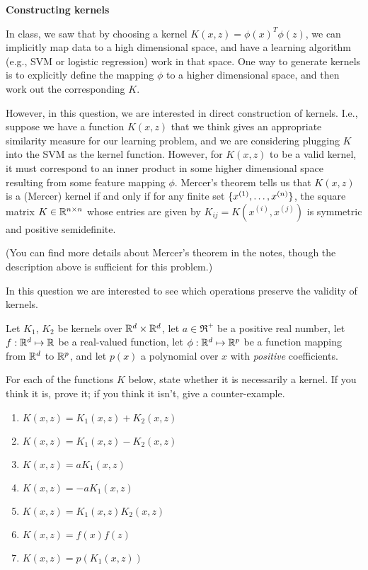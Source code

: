 \item {} {\bf Constructing kernels}

In class, we saw that by choosing a kernel $K(x,z) = \phi(x)^T\phi(z)$, we can
implicitly map data to a high dimensional space, and have a learning algorithm (e.g., SVM or logistic regression)
work in that space. One way to generate kernels is to explicitly define the
mapping $\phi$ to a higher dimensional space, and then work out the
corresponding $K$.

However, in this question, we are interested in direct construction of kernels.
I.e., suppose we have a function $K(x,z)$ that we think gives an appropriate
similarity measure for our learning problem, and we are considering plugging
$K$ into the SVM as the kernel function. However, for $K(x,z)$ to be a valid
kernel, it must correspond to an inner product in some higher dimensional space
resulting from some feature mapping $\phi$.  Mercer's theorem tells us that
$K(x,z)$ is a (Mercer) kernel if and only if for any finite set $\{x^{(1)},
\ldots, x^{({n})}\}$, the square matrix $K \in {\mathbb R}^{{n} \times {n}}$ whose entries
are given by $K_{ij} = K(x^{(i)},x^{(j)})$ is symmetric and positive
semidefinite.

(You can find more details about Mercer's theorem in the notes, though the description above is sufficient for this problem.)

%
In this question we are interested to see which operations preserve the validity of kernels. 
%

Let $K_1$, $K_2$ be kernels over ${\mathbb R}^{{d}} \times
{\mathbb R}^{{d}}$, let $a \in \Re^+$ be a positive real number, let $f: {\mathbb R}^{{d}} \mapsto
{\mathbb R}$ be a real-valued function, let $\phi: {\mathbb R}^{{d}} \mapsto {\mathbb R}^{p}$ be a
function mapping from ${\mathbb R}^{{d}}$ to ${\mathbb R}^{p}$, and let $p(x)$ a polynomial over $x$ with \emph{positive}
coefficients.

For each of the functions $K$ below, state whether it is necessarily a
kernel.  If you think it is, prove it; if you think it isn't, give a
counter-example.

\begin{enumerate}

\item {} $K(x,z) = K_1(x,z) + K_2(x,z)$
\item {} $K(x,z) = K_1(x,z) - K_2(x,z)$
\item {} $K(x,z) = a K_1(x,z)$
\item {} $K(x,z) = -a K_1(x,z)$
\item {} $K(x,z) = K_1(x,z)K_2(x,z)$
\item {} $K(x,z) = f(x)f(z)$
\item {} $K(x,z) = p(K_1(x,z))$

\end{enumerate}

\ifnum{} {
  
} \fi
